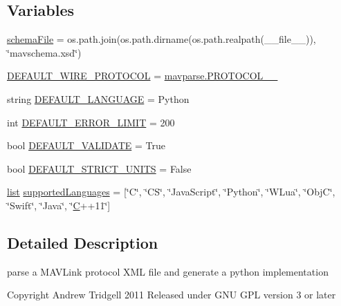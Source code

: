 \subsection*{Variables}
\begin{DoxyCompactItemize}
\item 
\mbox{\hyperlink{namespacepymavlink_1_1generator_1_1mavgen_af0e7f6ac0244a7a893599550ae69a662}{schema\+File}} = os.\+path.\+join(os.\+path.\+dirname(os.\+path.\+realpath(\+\_\+\+\_\+file\+\_\+\+\_\+)), \char`\"{}mavschema.\+xsd\char`\"{})
\item 
\mbox{\hyperlink{namespacepymavlink_1_1generator_1_1mavgen_abf74e4464cc281c1350dae3930435bed}{D\+E\+F\+A\+U\+L\+T\+\_\+\+W\+I\+R\+E\+\_\+\+P\+R\+O\+T\+O\+C\+OL}} = \mbox{\hyperlink{namespacepymavlink_1_1generator_1_1mavparse_ab308d4fdc1b0fbcfa2789aa6af08f46e}{mavparse.\+P\+R\+O\+T\+O\+C\+O\+L\+\_\+\_}}
\item 
string \mbox{\hyperlink{namespacepymavlink_1_1generator_1_1mavgen_a65f98f41c53e5f7e200dc0d29d5c145d}{D\+E\+F\+A\+U\+L\+T\+\_\+\+L\+A\+N\+G\+U\+A\+GE}} = \textquotesingle{}Python\textquotesingle{}
\item 
int \mbox{\hyperlink{namespacepymavlink_1_1generator_1_1mavgen_abd60aefad7485fc1278640acaa724ee5}{D\+E\+F\+A\+U\+L\+T\+\_\+\+E\+R\+R\+O\+R\+\_\+\+L\+I\+M\+IT}} = 200
\item 
bool \mbox{\hyperlink{namespacepymavlink_1_1generator_1_1mavgen_aee44fcfd95ce6860ecc9b4dc638b853b}{D\+E\+F\+A\+U\+L\+T\+\_\+\+V\+A\+L\+I\+D\+A\+TE}} = True
\item 
bool \mbox{\hyperlink{namespacepymavlink_1_1generator_1_1mavgen_aec8e6fd33aa2b796dbad37253958f2b2}{D\+E\+F\+A\+U\+L\+T\+\_\+\+S\+T\+R\+I\+C\+T\+\_\+\+U\+N\+I\+TS}} = False
\item 
\mbox{\hyperlink{structlist}{list}} \mbox{\hyperlink{namespacepymavlink_1_1generator_1_1mavgen_aab04d5e3d392e7ed72368d0ee440437a}{supported\+Languages}} = \mbox{[}\char`\"{}C\char`\"{}, \char`\"{}CS\char`\"{}, \char`\"{}Java\+Script\char`\"{}, \char`\"{}Python\char`\"{}, \char`\"{}W\+Lua\char`\"{}, \char`\"{}ObjC\char`\"{}, \char`\"{}Swift\char`\"{}, \char`\"{}Java\char`\"{}, \char`\"{}\mbox{\hyperlink{mavlink__sha256_8h_ac4cf4b2ab929bd23951a8676eeac086b}{C}}++11\char`\"{}\mbox{]}
\end{DoxyCompactItemize}


\subsection{Detailed Description}
\begin{DoxyVerb}parse a MAVLink protocol XML file and generate a python implementation

Copyright Andrew Tridgell 2011
Released under GNU GPL version 3 or later\end{DoxyVerb}
 

